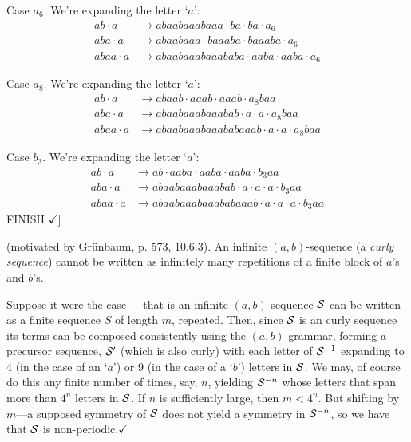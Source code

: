 \documentclass[11pt]{article}
\def\emph#1{{\em #1\/}}
\def\term#1{\emph{#1}}
\newcounter{thm}
\def\QED{$\checkmark$}
\def\ni{\noindent}
\def\ab{$(a,b)$}
\def\abg{\ab-grammar}
\def\q#1{`$#1$'}
\begin{document}
\ni Case $a_6$. We're expanding the letter \q{a}:
\begin{align*}
ab\cdot a&\rightarrow abaabaaabaaa\cdot ba\cdot ba \cdot a_6\\
aba\cdot a&\rightarrow abaabaaa\cdot baaaba\cdot baaaba \cdot a_6\\
abaa\cdot a&\rightarrow abaabaaabaaababa\cdot aaba\cdot aaba\cdot a_6
\end{align*}

\ni Case $a_8$. We're expanding the letter \q{a}:
\begin{align*}
ab\cdot a&\rightarrow abaab\cdot aaab\cdot aaab\cdot a_8baa\\
aba\cdot a&\rightarrow abaabaaabaaabab\cdot a\cdot a\cdot a_8baa\\
abaa\cdot a&\rightarrow abaabaaabaaababaaab\cdot a\cdot a\cdot a_8baa
\end{align*}

\ni Case $b_3$. We're expanding the letter \q{a}:
\begin{align*}
ab\cdot a&\rightarrow ab\cdot aaba\cdot aaba\cdot aaba\cdot b_3aa\\
aba\cdot a&\rightarrow abaabaaabaaabab\cdot a\cdot a\cdot a\cdot b_3aa\\
abaa\cdot a&\rightarrow abaabaaabaaababaaab\cdot a\cdot a\cdot a\cdot b_3aa
\end{align*}
FINISH
\QED]

\ni{\bf Proof of Theorem~\ref{thm:aperiodic}.} (motivated by Gr\"unbaum, p. 573, 10.6.3).
An infinite \ab-sequence (a \term{curly sequence}) cannot be written as infinitely many repetitions of
a finite block of $a$'s and $b$'s.

Suppose it were the case—--that is an infinite \ab-sequence $\mathcal{S}$ can be
written as a finite sequence $S$ of length $m$, repeated.  Then, since $\mathcal{S}$
is an curly sequence its terms can be composed consistently using the
\abg, forming a precursor sequence, $\mathcal{S}'$ (which is also curly) with
each letter of $\mathcal{S}^{-1}$ expanding to 4 (in the case of an \q{a}) or 9 (in the
case of a \q{b}) letters in $\mathcal{S}$.  We may, of course do this any finite number
of times, say, $n$, yielding $\mathcal{S}^{-n}$ whose letters that span more than
$4^n$ letters in $\mathcal{S}$.  If $n$ is sufficiently large, then $m < 4^n$.  But
shifting by $m$---a supposed symmetry of $\mathcal{S}$ does not yield a symmetry in
$\mathcal{S}^{-n}$, so we have that $\mathcal{S}$ is non-periodic.\QED
\end{document}
